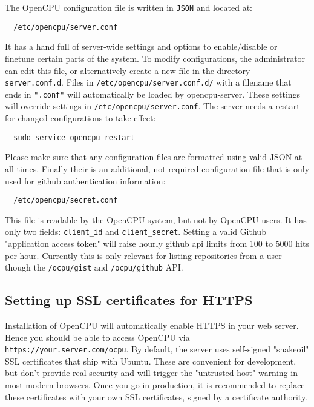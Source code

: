 \documentclass{scrartcl}\usepackage[]{graphicx}\usepackage[]{color}
\begin{document}
The OpenCPU configuration file is written in \texttt{JSON} and located at:

\begin{verbatim}
  /etc/opencpu/server.conf
\end{verbatim}
It has a hand full of server-wide settings and options to enable/disable or finetune certain parts of the system. To modify configurations, the administrator can edit this file, or alternatively create a new file in the directory \texttt{server.conf.d}. Files in \texttt{/etc/opencpu/server.conf.d/} with a filename that ends in \texttt{".conf"} will automatically be loaded by opencpu-server. These settings will override settings in \texttt{/etc/opencpu/server.conf}. The server needs a restart for changed configurations to take effect:

\begin{verbatim}
  sudo service opencpu restart
\end{verbatim}
Please make sure that any configuration files are formatted using valid JSON at all times. Finally their is an additional, not required configuration file that is only used for github authentication information:
\begin{verbatim}
  /etc/opencpu/secret.conf
\end{verbatim}
This file is readable by the OpenCPU system, but not by OpenCPU users. It has only two fields: \texttt{client\_id} and \texttt{client\_secret}. Setting a valid Github "application access token" will raise hourly github api limits from 100 to 5000 hits per hour. Currently this is only relevant for listing repositories from a user though the \texttt{/ocpu/gist} and \texttt{/ocpu/github} API.

\subsection{Setting up SSL certificates for HTTPS}

Installation of OpenCPU will automatically enable HTTPS in your web server. Hence you should be able to access OpenCPU via \texttt{https://your.server.com/ocpu}. By default, the server uses self-signed "snakeoil" SSL certificates that ship with Ubuntu. These are convenient for development, but don't provide real security and will trigger the "untrusted host" warning in most modern browsers. Once you go in production, it is recommended to replace these certificates with your own SSL certificates, signed by a certificate authority. \\
\end{document}
